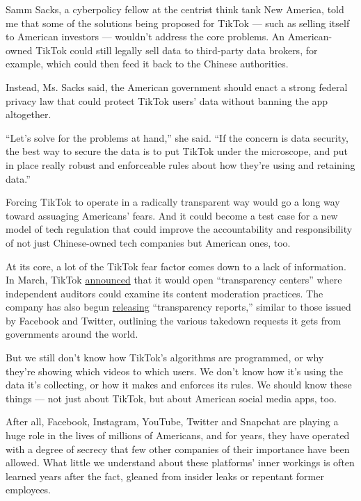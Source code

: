 Samm Sacks, a cyberpolicy fellow at the centrist think tank New America,
told me that some of the solutions being proposed for TikTok --- such as
selling itself to American investors --- wouldn't address the core
problems. An American-owned TikTok could still legally sell data to
third-party data brokers, for example, which could then feed it back to
the Chinese authorities.

Instead, Ms. Sacks said, the American government should enact a strong
federal privacy law that could protect TikTok users' data without
banning the app altogether.

``Let's solve for the problems at hand,'' she said. ``If the concern is
data security, the best way to secure the data is to put TikTok under
the microscope, and put in place really robust and enforceable rules
about how they're using and retaining data.''

Forcing TikTok to operate in a radically transparent way would go a long
way toward assuaging Americans' fears. And it could become a test case
for a new model of tech regulation that could improve the accountability
and responsibility of not just Chinese-owned tech companies but American
ones, too.

At its core, a lot of the TikTok fear factor comes down to a lack of
information. In March, TikTok
\href{https://newsroom.tiktok.com/en-us/tiktok-to-launch-transparency-center-for-moderation-and-data-practices}{announced}
that it would open ``transparency centers'' where independent auditors
could examine its content moderation practices. The company has also
begun
\href{https://newsroom.tiktok.com/en-us/our-h-2-2019-transparency-report}{releasing}
``transparency reports,'' similar to those issued by Facebook and
Twitter, outlining the various takedown requests it gets from
governments around the world.

But we still don't know how TikTok's algorithms are programmed, or why
they're showing which videos to which users. We don't know how it's
using the data it's collecting, or how it makes and enforces its rules.
We should know these things --- not just about TikTok, but about
American social media apps, too.

After all, Facebook, Instagram, YouTube, Twitter and Snapchat are
playing a huge role in the lives of millions of Americans, and for
years, they have operated with a degree of secrecy that few other
companies of their importance have been allowed. What little we
understand about these platforms' inner workings is often learned years
after the fact, gleaned from insider leaks or repentant former
employees.

